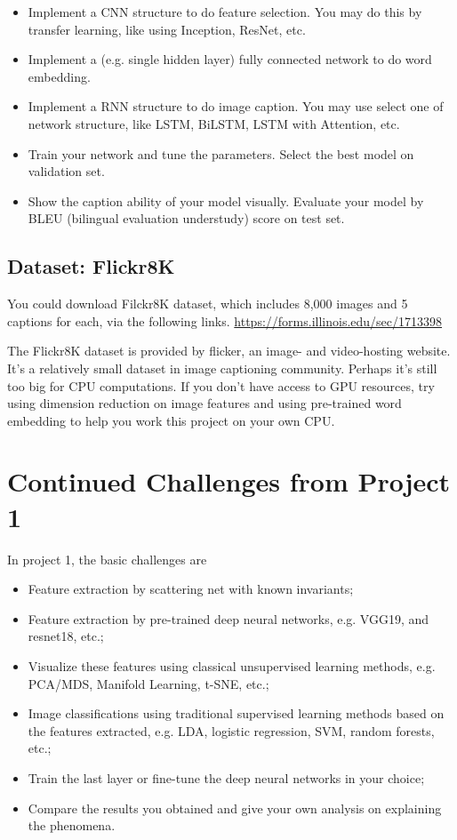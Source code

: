 \documentclass[11pt]{article}
\begin{document}
\begin{itemize}
\item Implement a CNN structure to do feature selection. You may do this by transfer learning, like using Inception, ResNet, etc.
\item Implement a (e.g. single hidden layer) fully connected network to do word embedding.
\item Implement a RNN structure to do image caption. You may use select one of network structure, like LSTM, BiLSTM, LSTM with Attention, etc.
\item Train your network and tune the parameters. Select the best model on validation set.
\item Show the caption ability of your model visually. Evaluate your model by BLEU (bilingual evaluation understudy) score on test set.
\end{itemize}

\subsection{Dataset: Flickr8K}
You could download Filckr8K dataset, which includes 8,000 images and 5 captions for each, via the following links.
\url{https://forms.illinois.edu/sec/1713398}

The Flickr8K dataset is provided by flicker, an image- and video-hosting website. It's a relatively small dataset in image captioning community. Perhaps it's still too big for CPU computations. If you don't have access to GPU resources,  try using dimension reduction on image features and using pre-trained word embedding to help you work this project on your own CPU.

\section{Continued Challenges from Project 1}
In project 1, the basic challenges are
\begin{itemize}
\item Feature extraction by scattering net with known invariants; 
\item Feature extraction by pre-trained deep neural networks, e.g. VGG19, and resnet18, etc.;
\item Visualize these features using classical unsupervised learning methods, e.g. PCA/MDS, Manifold Learning, t-SNE, etc.; 
\item Image classifications using traditional supervised learning methods based on the features extracted, e.g. LDA, logistic regression, SVM, random forests, etc.;
\item Train the last layer or fine-tune the deep neural networks in your choice; 
\item Compare the results you obtained and give your own analysis on explaining the phenomena.
\end{itemize}
\end{document}

